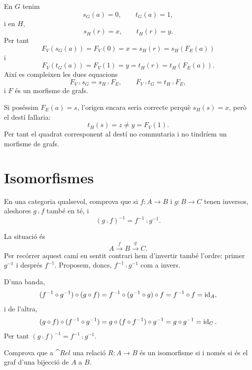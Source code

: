 \begin{solucio}
En $G$ tenim
\[
s_G(a)=0,
\qquad
t_G(a)=1,
\]
i en $H$,
\[
s_H(r)=x,
\qquad
t_H(r)=y.
\]
Per tant
\[
F_V(s_G(a))=F_V(0)=x=s_H(r)=s_H(F_E(a))
\]
i
\[
F_V(t_G(a))=F_V(1)=y=t_H(r)=t_H(F_E(a)).
\]
Així es compleixen les dues equacions
\[
F_V\comp s_G=s_H\comp F_E,
\qquad
F_V\comp t_G=t_H\comp F_E,
\]
i $F$ és un morfisme de grafs.

Si poséssim $F_E(a)=s$, l'origen encara seria correcte perquè $s_H(s)=x$, però el destí fallaria:
\[
t_H(s)=z\neq y=F_V(1).
\]
Per tant el quadrat corresponent al destí no commutaria i no tindríem un morfisme de grafs.
\end{solucio}

\section{Isomorfismes}

\begin{exercici}
En una categoria qualsevol, comprova que si $f\colon A\to B$ i $g\colon B\to C$ tenen inversos, aleshores $g\comp f$ també en té, i
\[
(g\comp f)^{-1}=f^{-1}\comp g^{-1}.
\]
\end{exercici}

\begin{solucio}
La situació és
\[
A\xrightarrow{f}B\xrightarrow{g}C.
\]
Per recórrer aquest camí en sentit contrari hem d'invertir també l'ordre: primer $g^{-1}$ i després $f^{-1}$. Proposem, doncs, $f^{-1}\comp g^{-1}$ com a invers.

D'una banda,
\[
(f^{-1}\circ g^{-1})\circ(g\circ f)
=f^{-1}\circ(g^{-1}\circ g)\circ f
=f^{-1}\circ f
=\operatorname{id}_A,
\]
i de l'altra,
\[
(g\circ f)\circ(f^{-1}\circ g^{-1})
=g\circ(f\circ f^{-1})\circ g^{-1}
=g\circ g^{-1}
=\operatorname{id}_C.
\]
Per tant $(g\comp f)^{-1}=f^{-1}\comp g^{-1}$.
\end{solucio}

\begin{exercici}
Comprova que a $\cat{Rel}$ una relació $R\colon A\to B$ és un isomorfisme si i només si és el graf d'una bijecció de $A$ a $B$.
\end{exercici}

